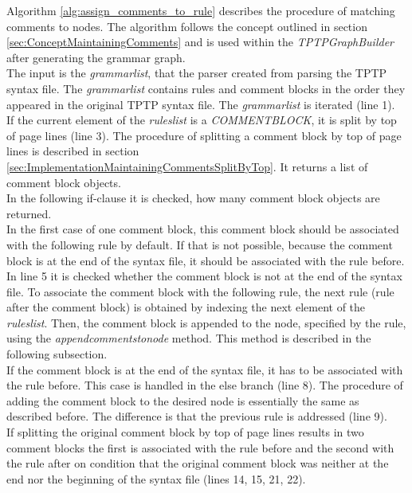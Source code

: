 Algorithm \ref{alg:assign_comments_to_rule} describes the procedure of matching comments to nodes. The algorithm follows the concept outlined in section \ref{sec:ConceptMaintainingComments} and is used within the \textit{TPTPGraphBuilder} after generating the grammar graph.\\
The input is the \textit{grammar\textunderscore list}, that the parser created from parsing the \ac{TPTP} syntax file.
The \textit{grammar\textunderscore list} contains rules and comment blocks in the order they appeared in the original \ac{TPTP} syntax file.
The \textit{grammar\textunderscore list} is iterated (line 1).\\
If the current element of the \textit{rules\textunderscore list} is a \textit{COMMENT\textunderscore BLOCK}, it is split by top of page lines (line 3).
The procedure of splitting a comment block by top of page lines is described in section \ref{sec:ImplementationMaintainingCommentsSplitByTop}.
It returns a list of comment block objects.\\
In the following if-clause it is checked, how many comment block objects are returned.\\
In the first case of one comment block, this comment block should be associated with the following rule by default. If that is not possible, because the comment block is at the end of the syntax file, it should be associated with the rule before.
In line 5 it is checked whether the comment block is not at the end of the syntax file. To associate the comment block with the following rule, the next rule (rule after the comment block) is obtained by indexing the next element of the \textit{rules\textunderscore list}.
Then, the comment block is appended to the node, specified by the rule, using the \textit{append\textunderscore comments\textunderscore to\textunderscore node} method. This method is described in the following subsection.\\
If the comment block is at the end of the syntax file, it has to be associated with the rule before.
This case is handled in the else branch (line 8).
The procedure of adding the comment block to the desired node is essentially the same as described before. The difference is that the previous rule is addressed (line 9).\\
If splitting the original comment block by top of page lines results in two comment blocks the first is associated with the rule before and the second with the rule after on condition that the original comment block was neither at the end nor the beginning of the syntax file (lines 14, 15, 21, 22).\\
